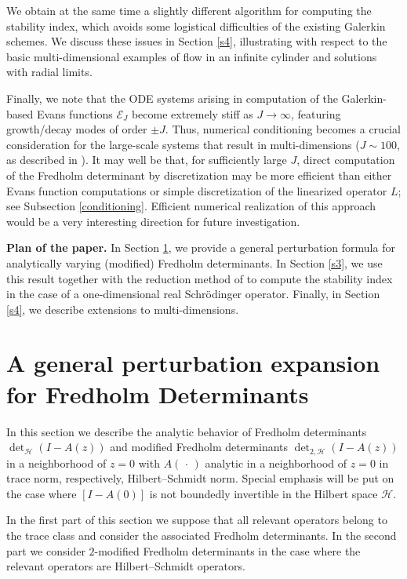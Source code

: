 We obtain at the same time a slightly different algorithm for computing
the stability index, which avoids some logistical
difficulties of the existing Galerkin schemes.
We discuss these issues in Section \ref{s4}, illustrating with respect
to the basic multi-dimensional examples of
flow in an infinite cylinder and solutions with radial limits. 

Finally, we note that the ODE systems arising in computation of
the Galerkin-based Evans functions ${{\mathcal E}}_J$ become extremely stiff
as $J\to \infty$, featuring growth/decay modes of order $\pm J$.
Thus, numerical conditioning becomes a crucial consideration for the
large-scale systems that result in multi-dimensions
($J\sim 100$, as described in \cite{HZ06}).
It may well be that, for sufficiently large $J$,
direct computation of the Fredholm determinant by discretization
may be more efficient than either Evans function computations
or simple discretization of the linearized operator $L$;
see Subsection \ref{conditioning}. 
Efficient numerical realization of this approach would be
a very interesting direction for future investigation.

{\bf Plan of the paper.}
In Section \ref{s2}, we provide a general perturbation
formula for analytically varying (modified) Fredholm determinants.
In Section \ref{s3}, we use this result together with the
reduction method of \cite{GM04}
to compute the stability index in the case of a one-dimensional
real Schr\"odinger operator.
Finally, in Section \ref{s4}, we describe
extensions to multi-dimensions.

\section{A general perturbation expansion for Fredholm Determinants}
\label{s2}

In this section we describe the analytic behavior of Fredholm determinants
${\det}_{{\mathcal H}}(I-A(z))$ and modified Fredholm determinants
${\det}_{2,{{\mathcal H}}}(I-A(z))$ in a
neighborhood of $z=0$ with $A({\,\cdot\,})$ analytic in a neighborhood of $z=0$ in
trace norm, respectively, Hilbert--Schmidt norm. Special emphasis
will be put on
the case where $[I-A(0)]$ is not boundedly invertible in the Hilbert
space ${{\mathcal H}}$.

In the first part of this section we suppose that all relevant
operators belong to
the trace class and consider the associated Fredholm determinants. In
the second
part we consider $2$-modified Fredholm determinants in the case where the
relevant operators are Hilbert--Schmidt operators.

